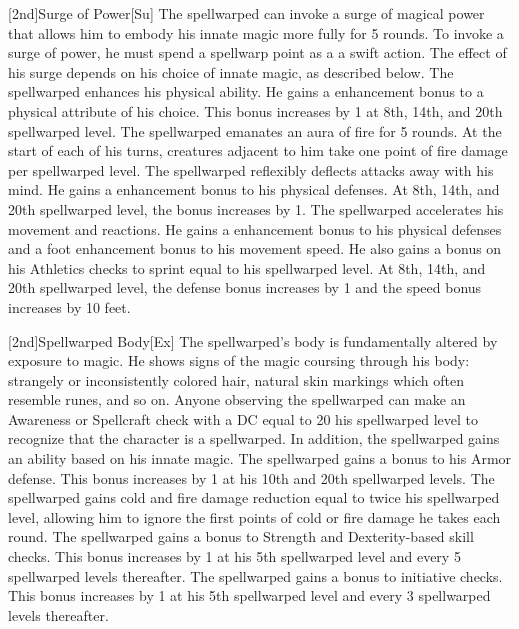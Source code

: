 [2nd]{Surge of Power}[Su]
The spellwarped can invoke a surge of magical power that allows him to embody his innate magic more fully for 5 rounds.
To invoke a surge of power, he must spend a spellwarp point as a a swift action.
The effect of his surge depends on his choice of innate magic, as described below.
The spellwarped enhances his physical ability.
He gains a  enhancement bonus to a physical attribute of his choice.
This bonus increases by 1 at 8th, 14th, and 20th spellwarped level.
The spellwarped emanates an aura of fire for 5 rounds.
At the start of each of his turns, creatures adjacent to him take one point of fire damage per spellwarped level.
The spellwarped reflexibly deflects attacks away with his mind.
He gains a  enhancement bonus to his physical defenses.
At 8th, 14th, and 20th spellwarped level, the bonus increases by 1.
The spellwarped accelerates his movement and reactions.
He gains a  enhancement bonus to his physical defenses and a  foot enhancement bonus to his movement speed.
He also gains a bonus on his Athletics checks to sprint equal to his spellwarped level.
At 8th, 14th, and 20th spellwarped level, the defense bonus increases by 1 and the speed bonus increases by 10 feet.

[2nd]{Spellwarped Body}[Ex]
The spellwarped's body is fundamentally altered by exposure to magic.
He shows signs of the magic coursing through his body: strangely or inconsistently colored hair, natural skin markings which often resemble runes, and so on.
Anyone observing the spellwarped can make an Awareness or Spellcraft check with a DC equal to 20 \sub his spellwarped level to recognize that the character is a spellwarped.
In addition, the spellwarped gains an ability based on his innate magic.
The spellwarped gains a  bonus to his Armor defense.
This bonus increases by 1 at his 10th and 20th spellwarped levels.
The spellwarped gains cold and fire damage reduction equal to twice his spellwarped level, allowing him to ignore the first points of cold or fire damage he takes each round.
The spellwarped gains a  bonus to Strength and Dexterity-based skill checks.
This bonus increases by 1 at his 5th spellwarped level and every 5 spellwarped levels thereafter.
The spellwarped gains a  bonus to initiative checks.
This bonus increases by 1 at his 5th spellwarped level and every 3 spellwarped levels thereafter.

